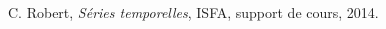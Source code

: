 \begin{thebibliography}{ABC}	


\label{ref1} C. Robert, \emph{Séries temporelles}, ISFA, support de cours, 2014.


\end{thebibliography}


